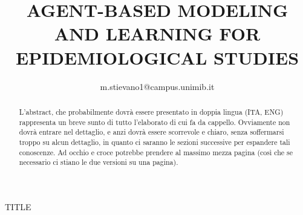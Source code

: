 \documentclass{article}
\title{AGENT-BASED MODELING AND LEARNING FOR EPIDEMIOLOGICAL STUDIES}
\author{m.stievano1@campus.unimib.it}
\begin{document}
TITLE

\begin{abstract}
    L'abstract, che probabilmente dovrà essere presentato in doppia lingua (ITA, ENG)
    rappresenta un breve sunto di tutto l'elaborato di cui fa da cappello. 
    Ovviamente non dovrà entrare nel dettaglio, e anzi dovrà essere scorrevole e 
    chiaro, senza soffermarsi troppo su alcun dettaglio, in quanto ci saranno 
    le sezioni successive per espandere tali conoscenze. Ad occhio e croce potrebbe
    prendere al massimo mezza pagina (così che se necessario ci stiano le due versioni su una pagina).
\end{abstract}



\tableofcontents
\newpage

















% 

\nocite{*}

% 


\end{document}
